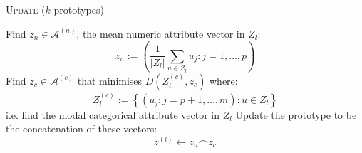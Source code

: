 \balg%
    \caption{\textsc{Update} (\(k\)-prototypes)}\label{alg:kprototypes_update}

    Find \(z_n \in \mathcal A^{(n)}\), the mean numeric attribute vector in
    \(Z_l\):
    \[
        z_n := \left(%
            \frac{1}{\lvert Z_l \rvert} \sum_{u \in Z_l} u_j :
            j = 1, \ldots, p
        \right)%
    \]\;
    Find \(z_c \in \mathcal A^{(c)}\) that minimises
    \(D\left(Z_l^{(c)},z_c\right)\) where:
    \[
        Z_l^{(c)} := \left\{%
            (u_j: j = p+1, \ldots, m) : u \in Z_l 
        \right\}%
    \]
    i.e. find the modal categorical attribute vector in \(Z_l\)\;
    Update the prototype to be the concatenation of these vectors:
    \[
        z^{(l)} \gets z_n \frown z_c%
    \]
\ealg%
